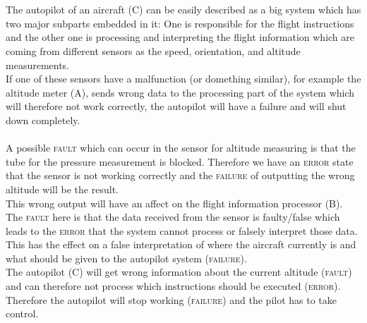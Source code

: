 \documentclass{article}
\begin{document}
\begin{adjustwidth}{2em}{2em}
		\hfill \\ \\		
		The autopilot of an aircraft (C) can be easily described as a big system which has two major subparts embedded in it: One is responsible for the flight instructions and the other one is processing and interpreting the flight information which are coming from different sensors as the speed, orientation, and altitude measurements. \\
		If one of these sensors have a malfunction (or domething similar), for example the altitude meter (A), sends wrong data to the processing part of the system which will therefore not work correctly, the autopilot will have a failure and will shut down completely. \\ \\
		A possible \textsc{fault} which can occur in the sensor for altitude measuring is that the tube for the pressure measurement is blocked. Therefore we have an \textsc{error} state that the sensor is not working correctly and the \textsc{failure} of outputting the wrong altitude will be the result. \\
		This wrong output will have an affect on the flight information processor (B). The \textsc{fault} here is that the data received from the sensor is faulty/false which leads to the \textsc{error} that the system cannot process or falsely interpret those data. This has the effect on a false interpretation of where the aircraft currently is and what should be given to the autopilot system (\textsc{failure}). \\
		The autopilot (C) will get wrong information about the current altitude (\textsc{fault}) and can therefore not process which instructions should be executed (\textsc{error}). Therefore the autopilot will stop working (\textsc{failure}) and the pilot has to take control.
	\end{adjustwidth}	
\end{document}
